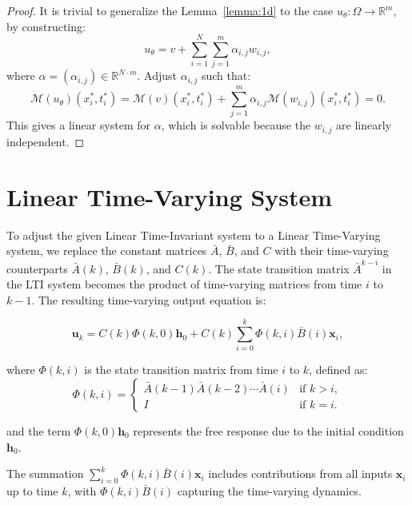 \documentclass{article}
\theoremstyle{plain}
\theoremstyle{definition}
\theoremstyle{remark}
\begin{document}
\begin{proof}
    It is trivial to generalize the Lemma~\ref{lemma:1d} to the case $u_\theta : \Omega \to \mathbb{R}^m$, by constructing:
    $$
   u_\theta = v + \sum_{i=1}^N \sum_{j=1}^m \alpha_{i,j} w_{i,j},
   $$
   where $ \alpha = (\alpha_{i,j}) \in \mathbb{R}^{N \cdot m} $. Adjust $ \alpha_{i,j} $ such that:
   $$
   \mathcal{M}(u_\theta)(x_i^*, t_i^*) = \mathcal{M}(v)(x_i^*, t_i^*) + \sum_{j=1}^m \alpha_{i,j} \mathcal{M}(w_{i,j})(x_i^*, t_i^*) = 0.
   $$
   This gives a linear system for $ \alpha $, which is solvable because the $ w_{i,j} $ are linearly independent.
\end{proof}


\section{Linear Time-Varying System}
\label{apx:LTI}

To adjust the given Linear Time-Invariant system to a Linear Time-Varying system, we replace the constant matrices $ \bar{A} $, $ \bar{B} $, and $ C $ with their time-varying counterparts $ \bar{A}(k) $, $ \bar{B}(k) $, and $ C(k) $. The state transition matrix $ \bar{A}^{k-i} $ in the LTI system becomes the product of time-varying matrices from time $ i $ to $ k-1 $. The resulting time-varying output equation is:

\begin{equation}
    \mathbf{u}_k = C(k) \Phi(k, 0) \mathbf{h}_0 + C(k) \sum_{i=0}^k \Phi(k, i) \bar{B}(i) \mathbf{x}_i,
\end{equation}



where $ \Phi(k, i) $ is the state transition matrix from time $ i $ to $ k $, defined as:
\begin{equation}
      \Phi(k, i) = \begin{cases} 
    \bar{A}(k-1) \bar{A}(k-2) \cdots \bar{A}(i) & \text{if } k > i, \\
    I & \text{if } k = i.
  \end{cases}
\end{equation}


  
and the term $ \Phi(k, 0) \mathbf{h}_0 $ represents the free response due to the initial condition $ \mathbf{h}_0 $.

The summation $ \sum_{i=0}^k \Phi(k, i) \bar{B}(i) \mathbf{x}_i $ includes contributions from all inputs $ \mathbf{x}_i $ up to time $ k $, with $ \Phi(k, i) \bar{B}(i) $ capturing the time-varying dynamics.
\end{document}
